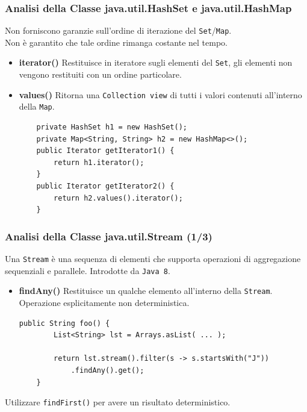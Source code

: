 \documentclass[]{beamer}
\begin{document}
\begin{frame}[fragile]
\frametitle{Analisi della Classe java.util.HashSet e java.util.HashMap}
Non forniscono garanzie sull'ordine di iterazione del \lstinline|Set|/\lstinline|Map|.\\
Non è garantito che tale ordine rimanga costante nel tempo.
\begin{block}{}
	\begin{itemize}
		\item \textbf{iterator()} Restituisce in iteratore sugli elementi del \lstinline|Set|, gli elementi non vengono restituiti con un ordine particolare.
		
		\item \textbf{values()} Ritorna una \lstinline|Collection view| di tutti i valori contenuti all'interno della \lstinline|Map|.
		
		\begin{lstlisting}
	private HashSet h1 = new HashSet();
	private Map<String, String> h2 = new HashMap<>();
	public Iterator getIterator1() {
		return h1.iterator();
	}
	public Iterator getIterator2() {
		return h2.values().iterator();
	}
		\end{lstlisting}
	\end{itemize}
\end{block}
\end{frame}

\begin{frame}[fragile]
\frametitle{Analisi della Classe java.util.Stream (1/3)}
Una \lstinline|Stream| è una sequenza di elementi che supporta operazioni di aggregazione sequenziali e parallele. Introdotte da \lstinline|Java 8|.
\begin{block}{}
	\begin{itemize}
		\item \textbf{findAny()} Restituisce un qualche elemento all'interno della \lstinline|Stream|. Operazione esplicitamente non deterministica.
		
		\begin{lstlisting}[breaklines=true]
	public String foo() {
		List<String> lst = Arrays.asList( ... );
		
		return lst.stream().filter(s -> s.startsWith("J"))
			.findAny().get();
	}
		\end{lstlisting}
	\end{itemize}
\end{block}
\begin{center}
	Utilizzare \lstinline|findFirst()| per avere un risultato deterministico.
\end{center}
\end{frame}
\end{document}
